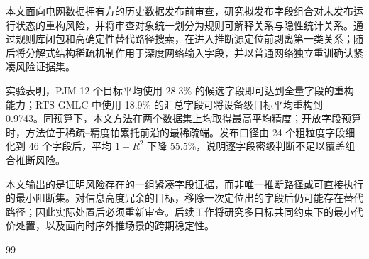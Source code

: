 \documentclass[UTF8,zihao=5,twoside,fontset=none]{ctexart}
\begin{document}
本文面向电网数据拥有方的历史数据发布前审查，研究拟发布字段组合对未发布运行状态的重构风险，并将审查对象统一划分为规则可解释关系与隐性统计关系。通过规则库闭包和高确定性替代路径搜索，在进入推断源定位前剥离第一类关系；随后将分解式结构稀疏机制作用于深度网络输入字段，并以普通网络独立重训确认紧凑风险证据集。

实验表明，PJM 12 个目标平均使用 28.3\% 的候选字段即可达到全量字段的重构能力；RTS-GMLC 中使用 18.9\% 的汇总字段可将设备级目标平均重构到 0.9743。同预算下，本文方法在两个数据集上均取得最高平均精度；开放字段预算时，方法位于稀疏--精度帕累托前沿的最稀疏端。发布口径由 24 个粗粒度字段细化到 46 个字段后，平均 $1-R^2$ 下降 55.5\%，说明逐字段密级判断不足以覆盖组合推断风险。

本文输出的是证明风险存在的一组紧凑字段证据，而非唯一推断路径或可直接执行的最小阻断集。对信息高度冗余的目标，移除一次定位出的字段后仍可能存在替代路径；因此实际处置后必须重新审查。后续工作将研究多目标共同约束下的最小代价处置，以及面向时序外推场景的跨期稳定性。

\begin{thebibliography}{99}
\linespread{1.05}\selectfont
\setlength{\itemsep}{0pt}

\end{thebibliography}

\vspace{0.4em}
\end{document}
